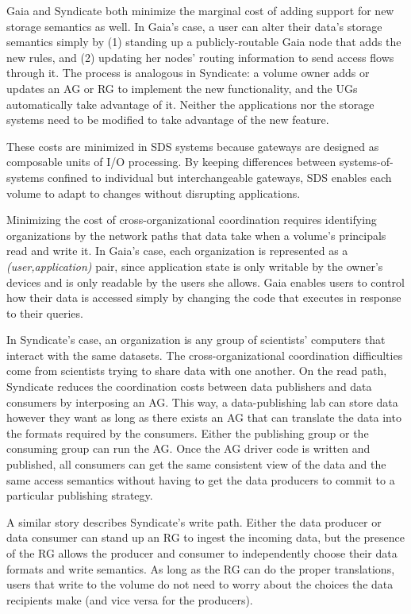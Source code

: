 Gaia and Syndicate both minimize the marginal cost of adding support for new
storage semantics as well.  In Gaia's case, a user can alter their data's
storage semantics simply by (1) standing up a publicly-routable Gaia node that adds the new
rules, and (2) updating her nodes' routing information to send access
flows through it.  The process is analogous in
Syndicate:  a volume owner adds or updates an AG or RG to implement the new
functionality, and the UGs automatically take advantage of it.
Neither the applications nor the
storage systems need to be modified to take advantage of the new
feature.

These costs are minimized in SDS systems because gateways are designed as
composable units of I/O processing.  By keeping
differences between systems-of-systems confined to individual but
interchangeable gateways, SDS enables each volume to adapt to
changes without disrupting applications.

Minimizing the cost of cross-organizational coordination requires identifying
organizations by the network paths that data take when a volume's principals
read and write it.  In Gaia's case, each organization is represented as a
\textit{(user,application)} pair, since
application state is only writable by the owner's devices and is only readable
by the users she allows.  Gaia enables users to control how their
data is accessed simply by changing the code that executes in response to their queries.

In Syndicate's case, an organization is any group of scientists' computers
that interact with the same datasets.  The cross-organizational coordination
difficulties come from scientists trying to share data with one another.
On the read path, Syndicate reduces the coordination costs between data publishers and data consumers by
interposing an AG.  This way, a data-publishing lab can store data however
they want as long as there exists an AG that can translate the data into the
formats required by the consumers.  Either the publishing group or the consuming
group can run the AG.  Once the AG driver code is written and published,
all consumers can get the same consistent view of the data and the same access
semantics without having to get the data producers to commit to a particular
publishing strategy.

A similar story describes Syndicate's write path.  Either the data producer or data
consumer can stand up an RG to ingest the incoming data, but the presence of the
RG allows the producer and consumer to independently choose their data formats
and write semantics.  As long as the RG can do the proper translations, users
that write to the volume do not need to worry about the choices the data
recipients make (and vice versa for the producers).

